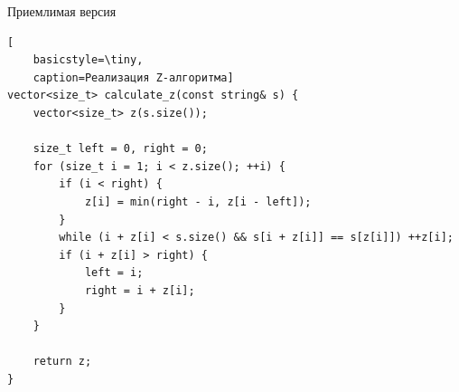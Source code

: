 \documentclass{beamer}
\theoremstyle{definition}
\begin{document}
\begin{frame}[fragile]{Приемлимая версия}

\begin{lstlisting}[
	basicstyle=\tiny, 
	caption=Реализация Z-алгоритма]
vector<size_t> calculate_z(const string& s) {
    vector<size_t> z(s.size());

    size_t left = 0, right = 0;
    for (size_t i = 1; i < z.size(); ++i) {
        if (i < right) {
            z[i] = min(right - i, z[i - left]);
        }
        while (i + z[i] < s.size() && s[i + z[i]] == s[z[i]]) ++z[i];
        if (i + z[i] > right) {
            left = i;
            right = i + z[i];
        }
    }

    return z;
}


\end{lstlisting}

\end{frame}
\end{document}
